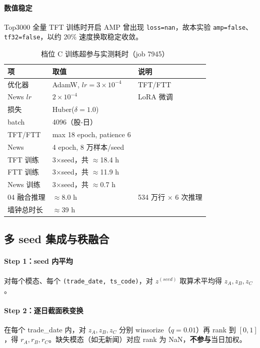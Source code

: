 \documentclass[UTF8,a4paper,12pt]{ctexart}
\begin{document}
\paragraph{数值稳定}

Top3000 全量 TFT 训练时开启 AMP 曾出现 \texttt{loss=nan}，故本实验 \texttt{amp=false}、\texttt{tf32=false}，以约 20\% 速度换取稳定收敛。

\begin{table}[H]
\centering
\caption{档位 C 训练超参与实测耗时（job 7945）}
\label{tab:hyper-c}
\begin{tabular}{llp{5cm}}
\toprule
\textbf{项} & \textbf{取值} & \textbf{说明} \\
\midrule
优化器 & AdamW, $lr=3\times 10^{-4}$ & TFT/FTT \\
News $lr$ & $2\times 10^{-4}$ & LoRA 微调 \\
损失 & Huber($\delta=1.0$) & \\
batch & 4096（股-日） & \\
TFT/FTT & max 18 epoch, patience 6 & \\
News & 4 epoch, 8 万样本/seed & \\
TFT 训练 & 3×seed，共 $\approx$18.4 h & \\
FTT 训练 & 3×seed，共 $\approx$11.9 h & \\
News 训练 & 3×seed，共 $\approx$0.7 h & \\
04 融合推理 & $\approx$8.0 h & 534 万行 × 6 次推理 \\
墙钟总时长 & $\approx$39 h & \\
\bottomrule
\end{tabular}
\end{table}

\subsection{多 seed 集成与秩融合}

\paragraph{Step 1：seed 内平均}

对每个模态、每个 \texttt{(trade\_date, ts\_code)}，对 $z^{(seed)}$ 取算术平均得 $z_A, z_B, z_C$。

\paragraph{Step 2：逐日截面秩变换}

在每个 trade\_date 内，对 $z_A,z_B,z_C$ 分别 winsorize（$q=0.01$）再 rank 到 $[0,1]$，得 $r_A,r_B,r_C$。缺失模态（如无新闻）对应 rank 为 NaN，\textbf{不参与}当日加权。
\end{document}
